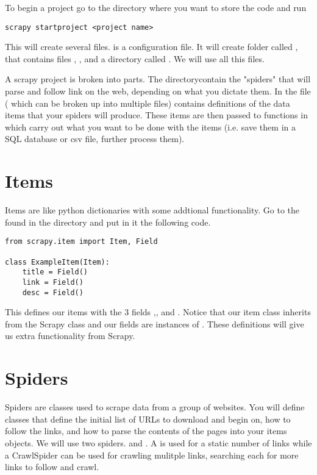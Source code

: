 To begin a project go to the directory where you want to store the code and run
\begin{lstlisting}
scrapy startproject <project name>
\end{lstlisting}
This will create several files.  is a configuration file. 
It will create folder called  , that contains files , ,  and a directory called . 
We will use all this files.

A scrapy project is broken into parts. 
The  directorycontain the "spiders" that will parse and follow link on the web, depending on what you dictate them. In the  file ( which can be broken up into multiple files) contains definitions of the data items that your spiders will produce. 
These items are then passed to functions in  which carry out what you want to be done with the items (i.e. save them in a SQL database or csv file, further process them).

\section*{Items}
Items are like python dictionaries with some addtional functionality. 
Go to the  found in the  directory
and put in it the following code.
\begin{lstlisting}
from scrapy.item import Item, Field

class ExampleItem(Item):
    title = Field()
    link = Field()
    desc = Field()
\end{lstlisting}

This defines our items with the 3 fields ,, and . 
Notice that our item class inherits from the Scrapy class  and our fields are instances of . 
These definitions will give us extra functionality from Scrapy.

\section*{Spiders}
Spiders are classes used to scrape data from a group of websites. 
You will define classes that define the initial list of URLs to download and begin on, how to follow the links, and how to parse the contents of the pages into your items objects. We will use two spiders. 
 and . 
A  is used for a static number of links while a CrawlSpider can be used for crawling mulitple links, searching each for more links to follow and crawl.

